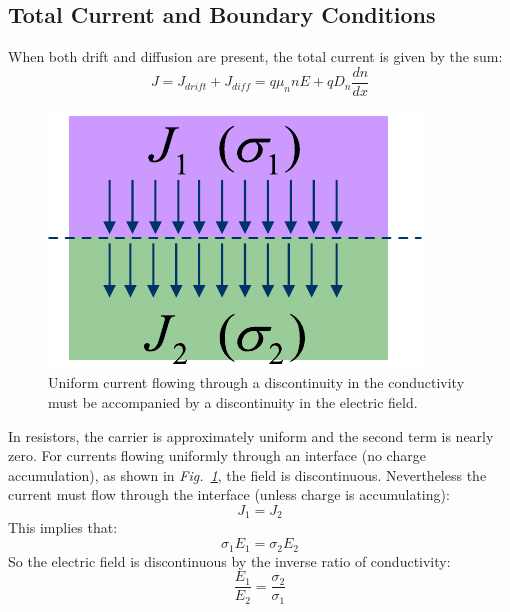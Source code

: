 \subsection{Total Current and Boundary Conditions}
When both drift and diffusion are present, the total current is given by the sum:
    \begin{equation}
        J = {J_{drift}} + {J_{diff}} = q{\mu _n}nE + q{D_n}\frac{{dn}}{{dx}}
    \end{equation}
\begin{figure}[H]
\centering
\includegraphics[width=.25\columnwidth]{slide50}
\caption{Uniform current flowing through a discontinuity in the conductivity must be accompanied by a discontinuity in the electric field.}
\label{fig:slide50}
\end{figure}
In resistors, the carrier is approximately uniform and the second term is nearly zero. For currents flowing uniformly through an interface (no charge accumulation), as shown in \emph{Fig.~\ref{fig:slide50}}, the field is discontinuous.  Nevertheless the current must flow through the interface (unless charge is accumulating):
    \begin{equation}
        {J_1} = {J_2}
    \end{equation}
This implies that:
    \begin{equation}
        {\sigma _1}{E_1} = {\sigma _2}{E_2}
    \end{equation}
So the electric field is discontinuous by the inverse ratio of conductivity:
    \begin{equation}
        \frac{{{E_1}}}{{{E_2}}} = \frac{{{\sigma _2}}}{{{\sigma _1}}}
    \end{equation}
